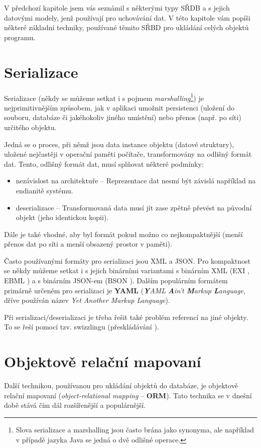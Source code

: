 V předchozí kapitole jsem vás seznámil s některými typy SŘDB a s jejich datovými modely, jenž používají pro uchovávání dat. V této kapitole vám popíši některé základní techniky, používané těmito SŘBD pro ukládání celých objektů programu.

\section{Serializace}
Serializace (někdy se můžeme setkat i s pojmem \emph{marshalling}\footnote{Slova serializace a marshalling jsou často brána jako synonyma, ale například v případě jazyka Java se jedná o dvě odlišné operace.\cite{rfc:2713}}) je nejprimitivnějším způsobem, jak v aplikaci umožnit persistenci (uložení do souboru, databáze či jakéhokoliv jiného umístění) nebo přenos (např. po síti) určitého objektu.

Jedná se o proces, při němž jsou data instance objektu (datové struktury), uložené nejčastěji v operační paměti počítače, transformovány na odlišný formát dat. Tento, odlišný formát dat, musí splňovat některé podmínky:

\begin{itemize}
\item nezávislost na architektuře -- Reprezentace dat nesmí být závislá například na endianitě systému.
\item deserializace -- Transformovaná data musí jít zase zpětně převést na původní objekt (jeho identickou kopii).
\end{itemize}

Dále je také vhodné, aby byl formát pokud možno co nejkompaktnější (menší přenos dat po síti a menší obsazený prostor v paměti).

Často používanými formáty pro serializaci jsou XML a JSON. Pro kompaktnost se někdy můžeme setkat i s jejich binárními variantami s binárním XML (EXI \cite{w3c:exi}, EBML \cite{rfc:ebml}) a s binárním JSON-em (BSON \cite{bson:spec}). Dalším populárním formátem primárně určeném pro serializaci je \textbf{YAML} \cite{rfc:yaml} (\emph{\textbf{Y}AML \textbf{A}in’t \textbf{M}arkup \textbf{L}anguage}, dříve používán název \emph{Yet Another Markup Language}).

Při serializaci/deserializaci je třeba řešit také problém referencí na jiné objekty. To se řeší pomocí tzv. swizzlingu (přeskládávání \cite{wiki:swizz}).

\section{Objektově relační mapovaní}
Další technikou, používanou pro ukládání objektů do databáze, je objektově relační mapovaní (\emph{object-relational mapping} -- \textbf{ORM}). Tato technika se v dnešní době stává čím dál rozšířenější a populárnější.

